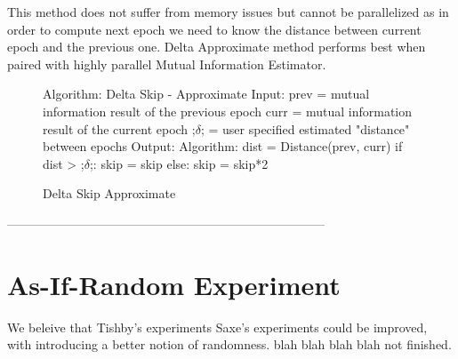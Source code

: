   This method does not suffer from memory issues but cannot be parallelized as
  in order to compute next epoch we need to know the distance between current
  epoch and the previous one. Delta Approximate method performs best when paired
  with highly parallel Mutual Information Estimator.

\begin{figure}[H]
    \begin{pythonfigure}
      Algorithm: Delta Skip - Approximate
      Input:
      prev = mutual information result of the previous epoch
      curr = mutual information result of the current epoch
      ;$\delta$; = user specified estimated "distance" between epochs
      Output:
      Algorithm:
      dist = Distance(prev, curr)
      if dist > ;$\delta$;:
        skip = skip
      else:
        skip = skip*2
    \end{pythonfigure}
    \caption{Delta Skip Approximate}
    \label{fig:deltaapprox}
\end{figure}

-----------------------------------------------------------------------------

\section{As-If-Random Experiment}

We beleive that Tishby's experiments Saxe's experiments could be improved, with
introducing a better notion of randomness. blah blah blah blah not finished.

